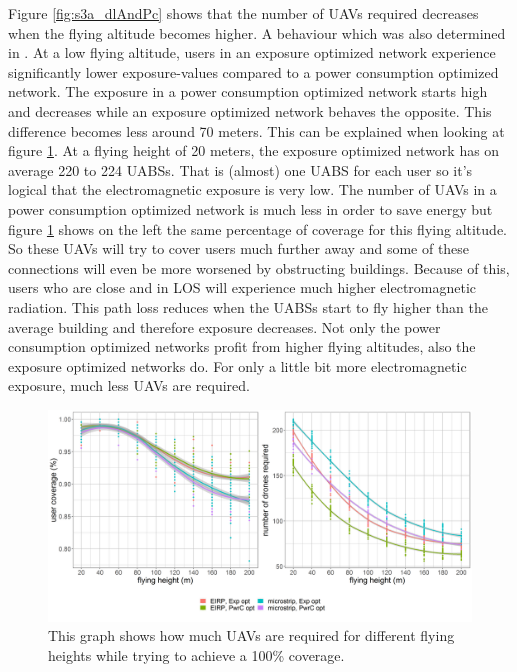 Figure \ref{fig:s3a_dlAndPc} shows that the number of \gls{UAV}s required decreases when the flying altitude becomes higher. A behaviour which was also determined in \cite{J2}.
At a low flying altitude, users in an exposure optimized network experience significantly lower exposure-values compared to a power consumption optimized network.
The exposure in a power consumption optimized network starts high and 
decreases while an exposure optimized network behaves the opposite. This difference becomes less 
around 70 meters.
This can be explained when looking at figure \ref{fig:s3a_numDronesAndCov}.
At a flying height of 20 meters, the exposure optimized network has on average 220 to 224 \gls{UABS}s. That is (almost) one \gls{UABS} for each user
so it's logical that the electromagnetic exposure is very low.
The number of \gls{UAV}s in a power consumption optimized network is much less in order 
to save energy but figure \ref{fig:s3a_numDronesAndCov} shows on the left the same percentage of coverage for this flying altitude.
So these \gls{UAV}s will try to cover users much further away and some of these connections will even be more worsened by obstructing buildings.
Because of this, users who are close and in \gls{LOS} will experience much higher electromagnetic radiation.
This path loss reduces when the \gls{UABS}s start to fly higher than the average building and therefore exposure decreases.
Not only the power consumption optimized networks profit from higher flying altitudes, also the exposure optimized networks do. For only a little bit 
more electromagnetic exposure, much less \gls{UAV}s are required.

\begin{figure}[]
  \includegraphics[width=\textwidth]{../results/s3/fhvsnumdronesAndCov.png}
  \caption{This graph shows how much \gls{UAV}s are required for different flying heights while trying to achieve a 100\% coverage.}
  \label{fig:s3a_numDronesAndCov}
\end{figure}

